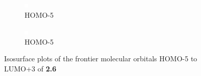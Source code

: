 \begin{figure}[!ht]
\begin{subfigure}[b]{0.31\textwidth}
  \includegraphics[clip=true, width=\textwidth, keepaspectratio]{images/mos/6h-4.eps}
  \caption{HOMO-5}
 \end{subfigure}
 \begin{subfigure}[b]{0.31\textwidth}
  \includegraphics[clip=true, width=\textwidth, keepaspectratio]{images/mos/6h-5.eps}
  \caption{HOMO-5}
 \end{subfigure}
\caption[Molecular orbitals HOMO-5 to LUMO+3 of \textbf{2.6}]{Isosurface plots of the frontier molecular orbitals HOMO-5 to LUMO+3 of \textbf{2.6}}
\label{fig.mo26}
\end{figure}

